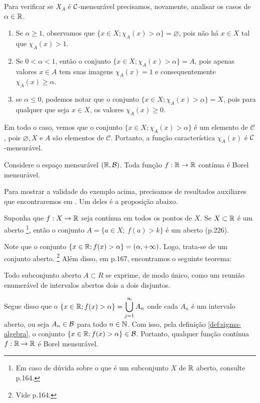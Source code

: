 Para verificar se $X_A$ é $\operatorname{\mathcal{C}}$-mensurável precisamos, novamente, analisar os casos de $\alpha \in \mathbb{R}$.
	\begin{enumerate}[label*= (\Roman*)]
		\item Se $\alpha \geq 1$, observamos que $\{x \in X; \chi_A(x)>  \alpha\} = \varnothing$, pois não há $x \in X$ tal que $\chi_A(x) > 1$.  
		\item Se $ 0 <\alpha < 1$, então o conjunto $\{x \in X; \chi_A(x)>  \alpha\} = A$, pois apenas valores $x \in A$ tem suas imagens $\chi_A(x) = 1$ e consequentemente $\chi_A(x) \geq \alpha$.
		\item  se $\alpha \leq 0$, podemos notar que o conjunto $\{x \in X; \chi_A(x)>  \alpha\} = X$, pois para qualquer que seja $x \in X$, os valores $\chi_A(x) \geq 0$.
	\end{enumerate}
Em todo o caso, vemos que o conjunto $\{x \in X; \chi_A(x)>  \alpha\}$ é um elemento de $\mathcal{C}$, pois $\varnothing, X$ e $A$ são elementos de $\mathcal{C}$. Portanto, a função característica $\chi_A(x)$ é $\operatorname{\mathcal{C}}$-mensurável.
\begin{example}
\label{ex:função-continua-mensuravel}
    Considere o espaço mensurável $(\mathbb{R}, \operatorname{\mathcal{B}})$. Toda função $f: \mathbb{R} \to \mathbb{R}$ contínua é Borel mensurável.
\end{example}
	Para mostrar a validade do exemplo acima, precisamos de resultados auxiliares que encontraremos em \cite{elon}.
	Um deles é a proposição abaixo.
\begin{proposition}
\label{cit:função-continua-mensuravel}
	Suponha que $f:X \to \mathbb{R}$ seja contínua em todos os pontos de $X$.
	Se $X \subset \mathbb{R}$ é um aberto
	\footnote{Em caso de dúvida sobre o que é um subconjunto $X$ de $\mathbb{R}$ aberto, consulte \supercite{elon}{p.164}.}, então o conjunto $A = \{a \in X;\ f(a)>k\}$ é um aberto (p.226).
\end{proposition}

	Note que o conjunto $\{x \in \mathbb{R}; f(x) > \alpha\} = (\alpha, +\infty)$.
	Logo, trata-se de um conjunto aberto.
	\footnote{Vide \supercite{elon}{p.164}.}
	Além disso, em \supercite{elon}{p.167}, encontramos o seguinte teorema:
	
	\begin{theorem}
		\label{teo:estrutura-abertos-reta}
		Todo subconjunto aberto $A \subset R$ se exprime, de modo único, como um reunião enumerável de intervalos abertos dois a dois disjuntos.
	\end{theorem}
	
	Segue disso que o
	$\{x \in \mathbb{R}; f(x) > \alpha\} = \displaystyle \bigcup_{j = 1}^\infty A_n$ onde cada $A_n$ é um intervalo aberto, ou seja $A_n \in \operatorname{\mathcal{B}}$ para todo $n \in \operatorname{\mathbb{N}}$.
	Com isso, pela definição \ref{def:sigma-algebra}, o conjunto $\{x \in \mathbb{R}; f(x) > \alpha\} \in \operatorname{\mathcal{B}}$.
	Portanto, qualquer função contínua $f: \mathbb{R} \to \mathbb{R}$ é Borel mensurável.


